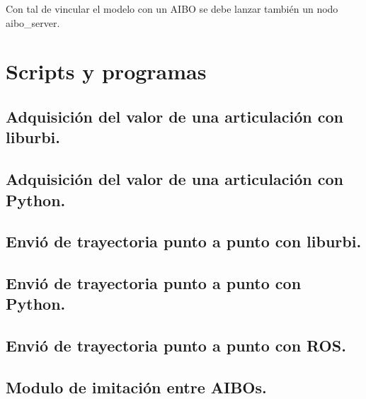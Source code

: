 \documentclass[12pt,a4paper,final,twoside]{article}
\begin{document}
Con tal de vincular el modelo con un AIBO se debe lanzar también un nodo aibo{\_}server.

\newpage

\section{Scripts y programas}
\subsection{Adquisición del valor de una articulación con liburbi.}
\label{getDataOneLegC++}


\subsection{Adquisición del valor de una articulación con Python.}
\label{getDataOneLegPy}


\subsection{Envió de trayectoria punto a punto con liburbi.}\label{sinC}


\subsection{Envió de trayectoria punto a punto con Python.}\label{sinP}


\subsection{Envió de trayectoria punto a punto con ROS.}\label{sinlegROS}


\subsection{Modulo de imitación entre AIBOs.}\label{mimiccode}

\end{document}
